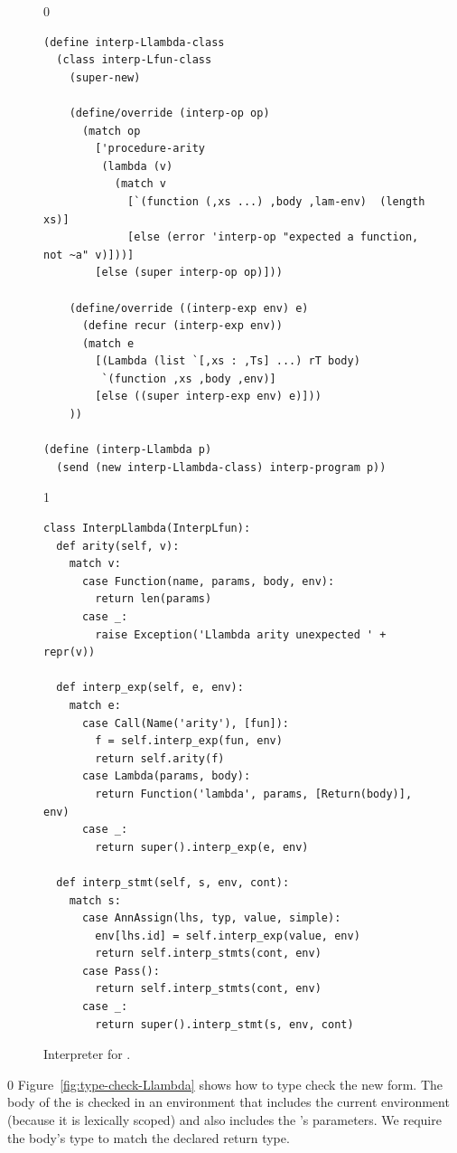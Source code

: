 \documentclass[7x10]{TimesAPriori_MIT}%
\def\racketEd{0}
\def\pythonEd{1}
\def\edition{1}
\newcommand{\pythonColor}[0]{}
\numberwithin{theorem}{chapter}
\numberwithin{definition}{chapter}
\numberwithin{equation}{chapter}
\begin{document}
\begin{figure}[tbp]
  \begin{tcolorbox}[colback=white]
    {\if\edition\racketEd 
\begin{lstlisting}
(define interp-Llambda-class
  (class interp-Lfun-class
    (super-new)

    (define/override (interp-op op)
      (match op
        ['procedure-arity
         (lambda (v)
           (match v
             [`(function (,xs ...) ,body ,lam-env)  (length xs)]
             [else (error 'interp-op "expected a function, not ~a" v)]))]
        [else (super interp-op op)]))

    (define/override ((interp-exp env) e)
      (define recur (interp-exp env))
      (match e
        [(Lambda (list `[,xs : ,Ts] ...) rT body)
         `(function ,xs ,body ,env)]
        [else ((super interp-exp env) e)]))
    ))

(define (interp-Llambda p)
  (send (new interp-Llambda-class) interp-program p))
\end{lstlisting}
\fi}
{\if\edition\pythonEd\pythonColor
\begin{lstlisting}
class InterpLlambda(InterpLfun):
  def arity(self, v):
    match v:
      case Function(name, params, body, env):
        return len(params)
      case _:
        raise Exception('Llambda arity unexpected ' + repr(v))
      
  def interp_exp(self, e, env):
    match e:
      case Call(Name('arity'), [fun]):
        f = self.interp_exp(fun, env)
        return self.arity(f)
      case Lambda(params, body):
        return Function('lambda', params, [Return(body)], env)
      case _:
        return super().interp_exp(e, env)
    
  def interp_stmt(self, s, env, cont):
    match s:
      case AnnAssign(lhs, typ, value, simple):
        env[lhs.id] = self.interp_exp(value, env)
        return self.interp_stmts(cont, env)
      case Pass():
        return self.interp_stmts(cont, env)
      case _:
        return super().interp_stmt(s, env, cont)
\end{lstlisting}
\fi}
  \end{tcolorbox}

  \caption{Interpreter for \LangLam{}.}
\label{fig:interp-Llambda}
\end{figure}


{\if\edition\racketEd
%
Figure~\ref{fig:type-check-Llambda} shows how to type check the new
 form. The body of the  is checked in an
environment that includes the current environment (because it is
lexically scoped) and also includes the 's parameters.  We
require the body's type to match the declared return type.
%
\fi}
\end{document}
